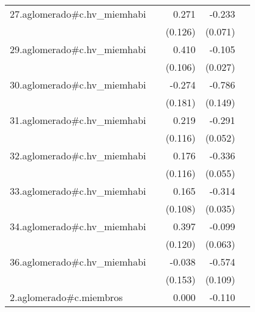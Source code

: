 {\begin{longtable}{l*{4}{D{.}{.}{-1}}}
\addlinespace
27.aglomerado#c.hv\_miemhabi&                     &       0.271\sym{*}  &      -0.233\sym{**} &                     \\
            &                     &     (0.126)         &     (0.071)         &                     \\
\addlinespace
29.aglomerado#c.hv\_miemhabi&                     &       0.410\sym{***}&      -0.105\sym{***}&                     \\
            &                     &     (0.106)         &     (0.027)         &                     \\
\addlinespace
30.aglomerado#c.hv\_miemhabi&                     &      -0.274         &      -0.786\sym{***}&                     \\
            &                     &     (0.181)         &     (0.149)         &                     \\
\addlinespace
31.aglomerado#c.hv\_miemhabi&                     &       0.219         &      -0.291\sym{***}&                     \\
            &                     &     (0.116)         &     (0.052)         &                     \\
\addlinespace
32.aglomerado#c.hv\_miemhabi&                     &       0.176         &      -0.336\sym{***}&                     \\
            &                     &     (0.116)         &     (0.055)         &                     \\
\addlinespace
33.aglomerado#c.hv\_miemhabi&                     &       0.165         &      -0.314\sym{***}&                     \\
            &                     &     (0.108)         &     (0.035)         &                     \\
\addlinespace
34.aglomerado#c.hv\_miemhabi&                     &       0.397\sym{***}&      -0.099         &                     \\
            &                     &     (0.120)         &     (0.063)         &                     \\
\addlinespace
36.aglomerado#c.hv\_miemhabi&                     &      -0.038         &      -0.574\sym{***}&                     \\
            &                     &     (0.153)         &     (0.109)         &                     \\
\addlinespace
2.aglomerado#c.miembros&                     &       0.000         &      -0.110\sym{***}&                     \\

\end{longtable}}
